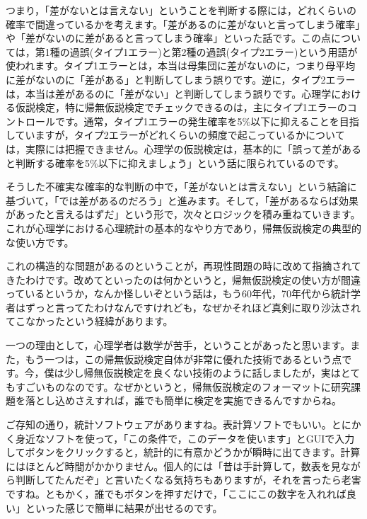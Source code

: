 \documentclass{ltjsbook}
\begin{document}
つまり，「差がないとは言えない」ということを判断する際には，どれくらいの確率で間違っているかを考えます。「差があるのに差がないと言ってしまう確率」や「差がないのに差があると言ってしまう確率」といった話です。この点については，第1種の過誤(タイプ1エラー)と第2種の過誤(タイプ2エラー)という用語が使われます。タイプ1エラーとは，本当は母集団に差がないのに，つまり母平均に差がないのに「差がある」と判断してしまう誤りです。逆に，タイプ2エラーは，本当は差があるのに「差がない」と判断してしまう誤りです。心理学における仮説検定，特に帰無仮説検定でチェックできるのは，主にタイプ1エラーのコントロールです。通常，タイプ1エラーの発生確率を5\%以下に抑えることを目指していますが，タイプ2エラーがどれくらいの頻度で起こっているかについては，実際には把握できません。心理学の仮説検定は，基本的に「誤って差があると判断する確率を5\%以下に抑えましょう」という話に限られているのです。

そうした不確実な確率的な判断の中で，「差がないとは言えない」という結論に基づいて，「では差があるのだろう」と進みます。そして，「差があるならば効果があったと言えるはずだ」という形で，次々とロジックを積み重ねていきます。これが心理学における心理統計の基本的なやり方であり，帰無仮説検定の典型的な使い方です。

これの構造的な問題があるのということが，再現性問題の時に改めて指摘されてきたわけです。改めてといったのは何かというと，帰無仮説検定の使い方が間違っているというか，なんか怪しいぞという話は，もう60年代，70年代から統計学者はずっと言ってたわけなんですけれども，なぜかそれほど真剣に取り沙汰されてこなかったという経緯があります。

一つの理由として，心理学者は数学が苦手，ということがあったと思います。また，もう一つは，この帰無仮説検定自体が非常に優れた技術であるという点です。今，僕は少し帰無仮説検定を良くない技術のように話しましたが，実はとてもすごいものなのです。なぜかというと，帰無仮説検定のフォーマットに研究課題を落とし込めさえすれば，誰でも簡単に検定を実施できるんですからね。

ご存知の通り，統計ソフトウェアがありますね。表計算ソフトでもいい。とにかく身近なソフトを使って，「この条件で，このデータを使います」とGUIで入力してボタンをクリックすると，統計的に有意かどうかが瞬時に出てきます。計算にはほとんど時間がかかりません。個人的には「昔は手計算して，数表を見ながら判断してたんだぞ」と言いたくなる気持ちもありますが，それを言ったら老害ですね。ともかく，誰でもボタンを押すだけで，「ここにこの数字を入れれば良い」といった感じで簡単に結果が出せるのです。
\end{document}
